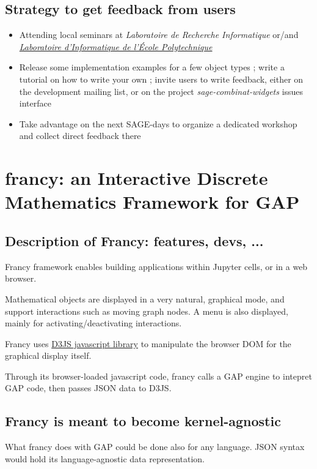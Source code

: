\documentclass{deliverablereport}
\begin{document}
\subsection{Strategy to get feedback from users}

\begin{itemize}
  \item Attending local seminars at \emph{Laboratoire de Recherche Informatique} or/and \emph{\href{https://www.lix.polytechnique.fr/}{Laboratoire d'Informatique de l'École Polytechnique}}
  \item Release some implementation examples for a few object types ; write a tutorial on how to write your own ; invite users to write feedback, either on the development mailing list, or on the  project \emph{sage-combinat-widgets} issues interface
  \item Take advantage on the next SAGE-days to organize a dedicated workshop and collect direct feedback there
\end{itemize}

\section{francy: an Interactive Discrete Mathematics Framework for GAP}
\label{francy}

\subsection{Description of Francy: features, devs, ...}

Francy framework enables building applications within Jupyter cells,
or in a web browser.

Mathematical objects are displayed in a very natural, graphical mode,
and support interactions such as moving graph nodes. A menu is also
displayed, mainly for activating/deactivating interactions.

Francy uses \href{d3js.org}{D3JS javascript library} to manipulate the
browser DOM for the graphical display itself.

Through its browser-loaded javascript code, francy calls a GAP engine to
intepret GAP code, then passes JSON data to D3JS.

\subsection{Francy is meant to become kernel-agnostic}

What francy does with GAP could be done also for any language. JSON
syntax would hold its language-agnostic data representation.
\end{document}
